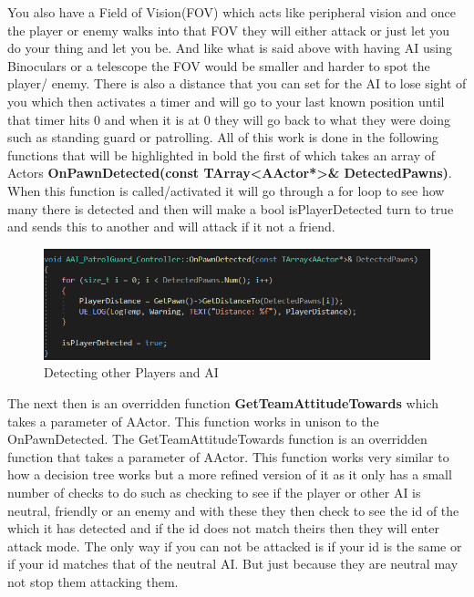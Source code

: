 You also have a Field of Vision(FOV) which acts like peripheral vision and once the player or enemy walks into that FOV they will either attack or just let you do your thing and let you be. And like what is said above with having AI using Binoculars or a telescope the FOV would be smaller and harder to spot the player/ enemy.
There is also a distance that you can set for the AI to lose sight of you which then activates a timer and will go to your last known position until that timer hits 0 and when it is at 0 they will go back to what they were doing such as standing guard or patrolling. All of this work is done in the following functions that will be highlighted in bold the first of which takes an array of Actors \textbf{OnPawnDetected(const TArray<AActor*>\& DetectedPawns)}. When this function is called/activated it will go through a for loop to see how many there is detected and then will make a bool isPlayerDetected turn to true and sends this to another and will attack if it not a friend.
\begin{figure}[H]
    \centering
    \includegraphics[scale=.5]{img/Detected.PNG}
    \caption{Detecting other Players and AI}
    \label{Detection}
\end{figure}
The next then is an overridden function \textbf{GetTeamAttitudeTowards} which takes a parameter of AActor. This function works in unison to the OnPawnDetected. The GetTeamAttitudeTowards function is an overridden function that takes a parameter of AActor. This function works very similar to how a decision tree works but a more refined version of it as it only has a small number of checks to do such as checking to see if the player or other AI is neutral, friendly or an enemy and with these they then check to see the id of the which it has detected and if the id does not match theirs then they will enter attack mode. The only way if you can not be attacked is if your id is the same or if your id matches that of the neutral AI. But just because they are neutral may not stop them attacking them.
